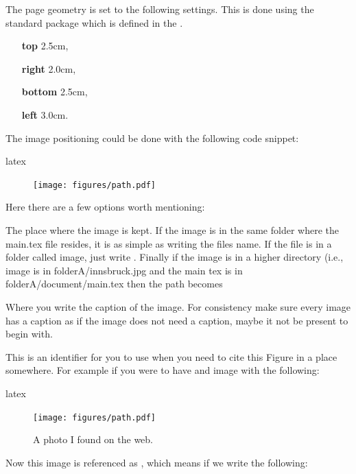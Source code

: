 \documentclass[minted, draw]{../tex/hebdomon}
\begin{document}

The page geometry is set to the following settings. This is done using the
standard package \pcode{\usepackage{geometry}} which is defined in the
.
%
\begin{itemize}[leftmargin=!,labelindent=-29.2pt]
	\item[\textbf{top}] 2.5cm,
	\item[\textbf{right}] 2.0cm,
	\item[\textbf{bottom}] 2.5cm,
	\item[\textbf{left}] 3.0cm.
\end{itemize}
%
%
The image positioning could be done with the following code snippet:
%
\begin{code}{latex}
\begin{figure}[ht]
  \centering
  \texttt{[image: figures/path.pdf]}
  \caption{\label{fig:label} }
\end{figure}
\end{code}
%
Here there are a few options worth mentioning:
%
\begin{hgitemize}
	\item[\pcode{figures/path}] The place where the image is kept. If the
	image is in the same folder where the main.tex file resides, it is as
	simple as writing the files name. If the file is in a folder called
	image, just write . Finally if the image is
	in a higher directory (i.e., image is in folderA/innsbruck.jpg and the
	main tex is in folderA/document/main.tex then the path becomes 
	\item[\pcode{\caption{..}}] Where you write the caption of the image.
	For consistency make sure every image has a caption as if the image does not
	need a caption, maybe it not be present to begin with.
	\item[\pcode{label{}}] This is an identifier for you to use when you need
	to cite this Figure in a place somewhere. For example if you were to have
	and image with the following:
\end{hgitemize}
%
\begin{code}{latex}
\begin{figure}[ht]
  \centering
  \texttt{[image: figures/path.pdf]}
  \caption{A photo I found on the web.}\label{fig:innsbruck}
\end{figure}
\end{code}
%
\begin{hgitemize}
	\item[] Now this image is referenced as , which
	means if we write the following:
\end{hgitemize}
\end{document}
